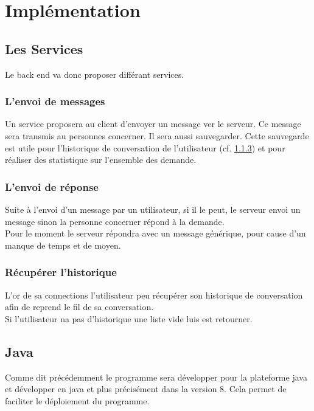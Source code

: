 \documentclass[12pt]{article}
\begin{document}
\section{Implémentation}

\subsection{Les Services}
Le back end va donc proposer différant services.

\subsubsection{L'envoi de messages}
Un service proposera au client d'envoyer un message ver le serveur.
Ce message sera	transmis au personnes concerner. Il sera aussi sauvegarder. Cette sauvegarde est utile pour l'historique de conversation de l'utilisateur (cf. \ref{recup_histo}) et pour réaliser des statistique sur l'ensemble des demande.


\subsubsection{L'envoi de réponse}
Suite à l'envoi d'un message par un utilisateur, si il le peut, le serveur envoi un message sinon la personne concerner répond à la demande.\\
Pour le moment le serveur répondra avec un message générique, pour cause d'un manque de temps et de moyen.


\subsubsection{Récupérer l'historique} \label{recup_histo}
L'or de sa connections l'utilisateur peu récupérer son historique de conversation afin de reprend le fil de sa conversation.
\\
Si l'utilisateur na pas d'historique une liste vide luis est retourner.



\subsection{Java}
Comme dit précédemment le programme sera développer pour la plateforme java et développer en java et plus précisément dans la version 8. Cela permet de faciliter le déploiement du programme.
\end{document}
